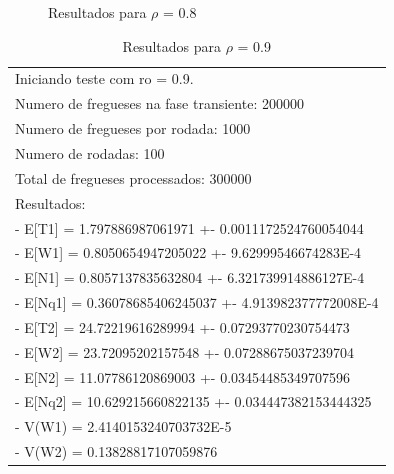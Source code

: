 \documentclass[a4paper,12pt]{report}
\begin{document}
\begin{figure}[htbp]
   \centering
   \caption{Resultados para $\rho$ = 0.8}
\end{figure}

\begin{table}[htbp]
  \begin{tabular}{l}
	\small Iniciando teste com ro = 0.9. \\
	\small Numero de fregueses na fase transiente: 200000 \\
	\small Numero de fregueses por rodada: 1000 \\
	\small Numero de rodadas: 100 \\
	\small Total de fregueses processados: 300000 \\
	\small Resultados: \\
	\small - E[T1] = 1.797886987061971 +- 0.0011172524760054044 \\
	\small - E[W1] = 0.8050654947205022 +- 9.62999546674283E-4 \\
	\small - E[N1] = 0.8057137835632804 +- 6.321739914886127E-4 \\
	\small - E[Nq1] = 0.36078685406245037 +- 4.913982377772008E-4 \\
	\small - E[T2] = 24.72219616289994 +- 0.07293770230754473 \\
	\small - E[W2] = 23.72095202157548 +- 0.07288675037239704 \\
	\small - E[N2] = 11.07786120869003 +- 0.03454485349707596 \\
	\small - E[Nq2] = 10.629215660822135 +- 0.034447382153444325 \\
	\small - V(W1) = 2.4140153240703732E-5 \\
	\small - V(W2) = 0.13828817107059876 \\
  \end{tabular}
\caption{Resultados para $\rho$ = 0.9}
\end{table}
\end{document}
